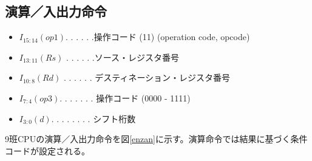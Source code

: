 \documentclass[a4paper,11pt,oneside,openany]{jsarticle}
\begin{document}
\subsection{演算／入出力命令}
\begin{itemize}
  \item $I_{15:14} (op1) $. . . . . .操作コード (11) (operation code, opcode)
  \item $I_{13:11} (Rs)$ . . . . . .ソース・レジスタ番号
  \item $I_{10:8} (Rd)$ . . . . . .  デスティネーション・レジスタ番号
  \item $I_{7:4} (op3) $. . . . . . . 操作コード (0000 - 1111)
  \item $I_{3:0} (d) $. . . . . . . .  シフト桁数
\end{itemize}
9班CPUの演算／入出力命令を図\ref{enzan}に示す。演算命令では結果に基づく条件コードが設定される。
\end{document}
